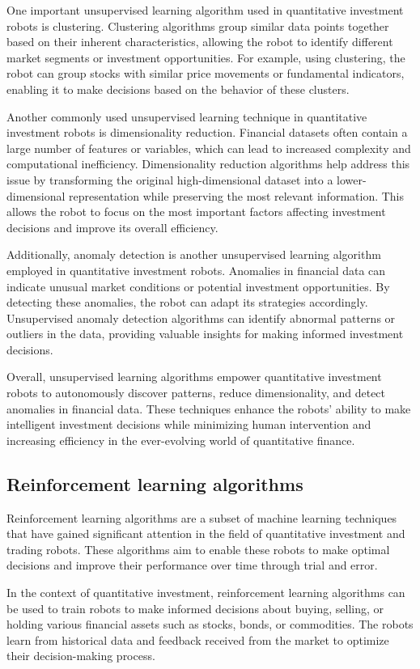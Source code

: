 \documentclass[UTF8]{ctexart}
\begin{document}
One important unsupervised learning algorithm used in quantitative investment robots is clustering. Clustering algorithms group similar data points together based on their inherent characteristics, allowing the robot to identify different market segments or investment opportunities. For example, using clustering, the robot can group stocks with similar price movements or fundamental indicators, enabling it to make decisions based on the behavior of these clusters.

Another commonly used unsupervised learning technique in quantitative investment robots is dimensionality reduction. Financial datasets often contain a large number of features or variables, which can lead to increased complexity and computational inefficiency. Dimensionality reduction algorithms help address this issue by transforming the original high-dimensional dataset into a lower-dimensional representation while preserving the most relevant information. This allows the robot to focus on the most important factors affecting investment decisions and improve its overall efficiency.

Additionally, anomaly detection is another unsupervised learning algorithm employed in quantitative investment robots. Anomalies in financial data can indicate unusual market conditions or potential investment opportunities. By detecting these anomalies, the robot can adapt its strategies accordingly. Unsupervised anomaly detection algorithms can identify abnormal patterns or outliers in the data, providing valuable insights for making informed investment decisions.

Overall, unsupervised learning algorithms empower quantitative investment robots to autonomously discover patterns, reduce dimensionality, and detect anomalies in financial data. These techniques enhance the robots' ability to make intelligent investment decisions while minimizing human intervention and increasing efficiency in the ever-evolving world of quantitative finance.
\subsection{Reinforcement learning algorithms}
Reinforcement learning algorithms are a subset of machine learning techniques that have gained significant attention in the field of quantitative investment and trading robots. These algorithms aim to enable these robots to make optimal decisions and improve their performance over time through trial and error.

In the context of quantitative investment, reinforcement learning algorithms can be used to train robots to make informed decisions about buying, selling, or holding various financial assets such as stocks, bonds, or commodities. The robots learn from historical data and feedback received from the market to optimize their decision-making process.
\end{document}
